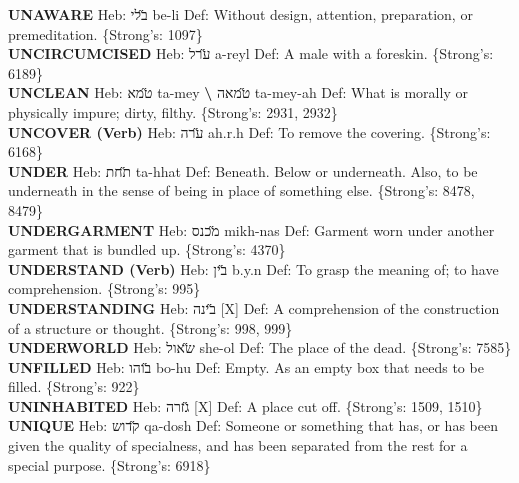 {\textbf{UNAWARE} Heb: {\large\H בלי} be-li Def: Without design, attention, preparation, or premeditation. \{Strong's: 1097\}\hfill{}\\

\textbf{UNCIRCUMCISED} Heb: {\large\H ערל} a-reyl Def: A male with a foreskin. \{Strong's: 6189\}\hfill{}\\

\textbf{UNCLEAN} Heb: {\large\H טמא} ta-mey \textbf{\textbackslash{}} {\large\H טמאה} ta-mey-ah Def: What is morally or physically impure; dirty, filthy. \{Strong's: 2931, 2932\}\hfill{}\\

\textbf{UNCOVER (Verb)} Heb: {\large\H ערה} ah.r.h Def: To remove the covering. \{Strong's: 6168\}\hfill{}\\

\textbf{UNDER} Heb: {\large\H תחת} ta-hhat Def: Beneath. Below or underneath. Also, to be underneath in the sense of being in place of something else. \{Strong's: 8478, 8479\}\hfill{}\\

\textbf{UNDERGARMENT} Heb: {\large\H מכנס} mikh-nas Def: Garment worn under another garment that is bundled up. \{Strong's: 4370\}\hfill{}\\

\textbf{UNDERSTAND (Verb)} Heb: {\large\H בין} b.y.n Def: To grasp the meaning of; to have comprehension. \{Strong's: 995\}\hfill{}\\

\textbf{UNDERSTANDING} Heb: {\large\H בינה} {[}X{]} Def: A comprehension of the construction of a structure or thought. \{Strong's: 998, 999\}\hfill{}\\

\textbf{UNDERWORLD} Heb: {\large\H שאול} she-ol Def: The place of the dead. \{Strong's: 7585\}\hfill{}\\

\textbf{UNFILLED} Heb: {\large\H בוהו} bo-hu Def: Empty. As an empty box that needs to be filled. \{Strong's: 922\}\hfill{}\\

\textbf{UNINHABITED} Heb: {\large\H גזרה} {[}X{]} Def: A place cut off. \{Strong's: 1509, 1510\}\hfill{}\\

\textbf{UNIQUE} Heb: {\large\H קדוש} qa-dosh Def: Someone or something that has, or has been given the quality of specialness, and has been separated from the rest for a special purpose. \{Strong's: 6918\}\hfill{}\\

}
